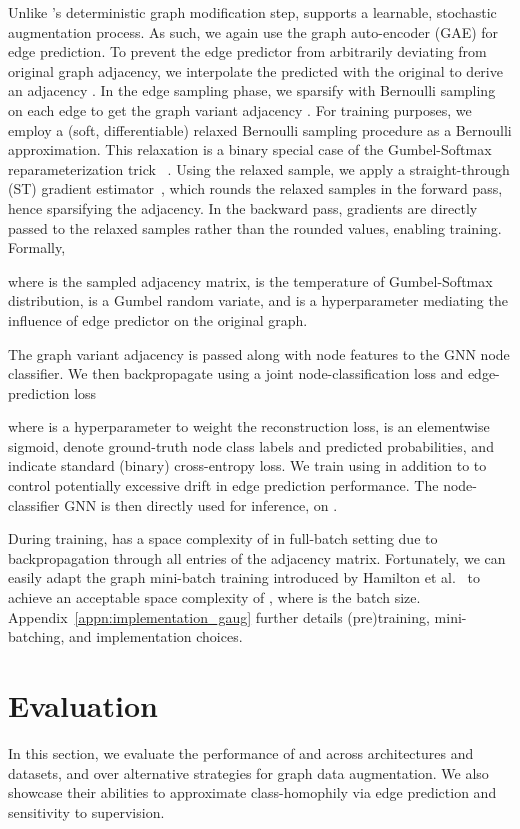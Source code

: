 \documentclass[letterpaper]{article} \usepackage{aaai21}  \usepackage{times}  \usepackage{helvet} \usepackage{courier}  \usepackage[hyphens]{url}  \usepackage{graphicx} \urlstyle{rm} \def\UrlFont{\rm}  \usepackage{natbib}  \usepackage{caption} \frenchspacing  \setlength{\pdfpagewidth}{8.5in}  \setlength{\pdfpageheight}{11in}
\begin{document}
Unlike \methodtwo's deterministic graph modification step, \method supports a learnable, stochastic augmentation process. As such, we again use the graph auto-encoder (GAE) for edge prediction.  To prevent the edge predictor from arbitrarily deviating from original graph adjacency, we interpolate the predicted   with the original  to derive an adjacency .  In the edge sampling phase, we sparsify  with Bernoulli sampling on each edge to get the graph variant adjacency . For training purposes, we employ a (soft, differentiable) relaxed Bernoulli sampling procedure as a Bernoulli approximation. This relaxation is a binary special case of the Gumbel-Softmax reparameterization trick ~\cite{maddison2016concrete, jang2016categorical}.  Using the relaxed  sample, we apply a straight-through (ST) gradient estimator~\cite{bengio2013estimating}, which rounds the relaxed samples in the forward pass, hence sparsifying the adjacency. In the backward pass, gradients are directly passed to the relaxed samples rather than the rounded values, enabling training. Formally, 

where  is the sampled adjacency matrix,  is the temperature of Gumbel-Softmax distribution,  is a Gumbel random variate, and  is a hyperparameter mediating the influence of edge predictor on the original graph. 


The graph variant adjacency  is passed along with node features  to the GNN node classifier. We then backpropagate using a joint node-classification loss  and edge-prediction loss 

where  is a hyperparameter to weight the reconstruction loss,   is an elementwise sigmoid,  denote ground-truth node class labels and predicted probabilities, and  indicate standard (binary) cross-entropy loss. We train using  in addition to  to control potentially excessive drift in edge prediction performance. The node-classifier GNN is then directly used for inference, on . 

During training, \method has a space complexity of  in full-batch setting due to backpropagation through all entries of the adjacency matrix.  Fortunately, we can easily adapt the graph mini-batch training introduced by Hamilton et al.~\cite{hamilton2017inductive} to achieve an acceptable space complexity of , where  is the batch size. Appendix~\ref{appn:implementation_gaug} further details (pre)training, mini-batching, and implementation choices. 

 
\section{Evaluation}
\label{sec:experiment}
In this section, we evaluate the performance of \methodtwo and \method across architectures and datasets, and over alternative strategies for graph data augmentation.  We also showcase their abilities to approximate class-homophily via edge prediction and  sensitivity to supervision.
\end{document}
